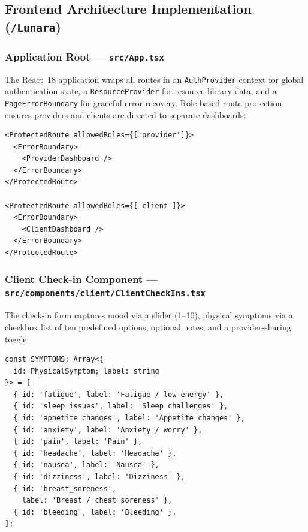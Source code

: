 \documentclass[12pt,letterpaper]{article}
\begin{document}
\newpage

\subsection{Frontend Architecture Implementation (\texttt{/Lunara})}

\subsubsection{Application Root --- \texttt{src/App.tsx}}

The React~18 application wraps all routes in an \texttt{AuthProvider} context for global authentication state, a \texttt{ResourceProvider} for resource library data, and a \texttt{PageErrorBoundary} for graceful error recovery. Role-based route protection ensures providers and clients are directed to separate dashboards:

\begin{lstlisting}[caption={Role-based route protection (\texttt{App.tsx})}]
<ProtectedRoute allowedRoles={['provider']}>
  <ErrorBoundary>
    <ProviderDashboard />
  </ErrorBoundary>
</ProtectedRoute>

<ProtectedRoute allowedRoles={['client']}>
  <ErrorBoundary>
    <ClientDashboard />
  </ErrorBoundary>
</ProtectedRoute>
\end{lstlisting}

\subsubsection{Client Check-in Component --- \texttt{src/components/client/ClientCheckIns.tsx}}

The check-in form captures mood via a slider (1--10), physical symptoms via a checkbox list of ten predefined options, optional notes, and a provider-sharing toggle:

\begin{lstlisting}[caption={Symptom definitions (\texttt{ClientCheckIns.tsx})}]
const SYMPTOMS: Array<{
  id: PhysicalSymptom; label: string
}> = [
  { id: 'fatigue', label: 'Fatigue / low energy' },
  { id: 'sleep_issues', label: 'Sleep challenges' },
  { id: 'appetite_changes', label: 'Appetite changes' },
  { id: 'anxiety', label: 'Anxiety / worry' },
  { id: 'pain', label: 'Pain' },
  { id: 'headache', label: 'Headache' },
  { id: 'nausea', label: 'Nausea' },
  { id: 'dizziness', label: 'Dizziness' },
  { id: 'breast_soreness',
    label: 'Breast / chest soreness' },
  { id: 'bleeding', label: 'Bleeding' },
];
\end{lstlisting}
\end{document}
